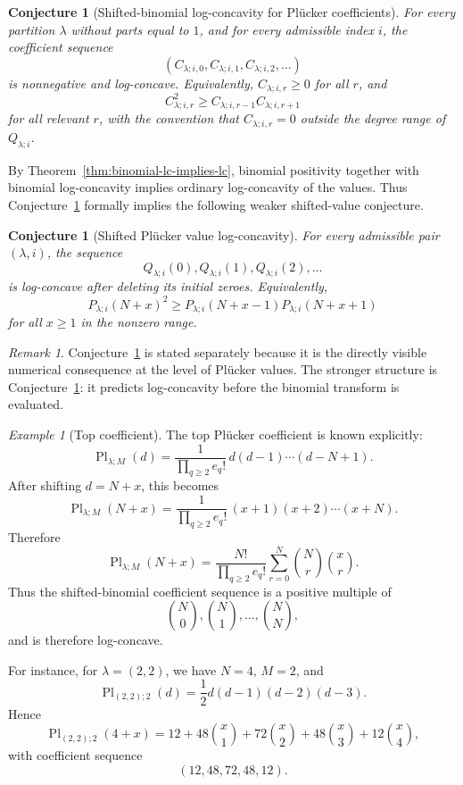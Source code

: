 \documentclass[11pt]{amsart}
\numberwithin{equation}{section}
\newtheorem{conjecture}[theorem]{Conjecture}
\theoremstyle{remark}
\newtheorem{remark}[theorem]{Remark}
\newtheorem{example}[theorem]{Example}
\begin{document}
\begin{conjecture}[Shifted-binomial log-concavity for Pl\"ucker coefficients]
\label{conj:shifted-plucker-binomial-lc}
For every partition $\lambda$ without parts equal to $1$, and for every
admissible index $i$, the coefficient sequence
\[
  (C_{\lambda;i,0},C_{\lambda;i,1},C_{\lambda;i,2},\ldots)
\]
is nonnegative and log-concave.  Equivalently, $C_{\lambda;i,r}\ge 0$ for all $r$, and
\[
  C_{\lambda;i,r}^2
  \ge
  C_{\lambda;i,r-1}C_{\lambda;i,r+1}
\]
for all relevant $r$, with the convention that $C_{\lambda;i,r}=0$
outside the degree range of $Q_{\lambda;i}$.
\end{conjecture}

By Theorem~\ref{thm:binomial-lc-implies-lc}, binomial positivity together
with binomial log-concavity implies ordinary log-concavity of the values.
Thus Conjecture~\ref{conj:shifted-plucker-binomial-lc} formally implies
the following weaker shifted-value conjecture.

\begin{conjecture}[Shifted Pl\"ucker value log-concavity]
\label{conj:shifted-plucker-value-lc}
For every admissible pair $(\lambda,i)$, the sequence
\[
  Q_{\lambda;i}(0),Q_{\lambda;i}(1),Q_{\lambda;i}(2),\ldots
\]
is log-concave after deleting its initial zeroes.  Equivalently,
\[
  P_{\lambda;i}(N+x)^2
  \ge
  P_{\lambda;i}(N+x-1)P_{\lambda;i}(N+x+1)
\]
for all $x\ge1$ in the nonzero range.
\end{conjecture}

\begin{remark}
 Conjecture~\ref{conj:shifted-plucker-value-lc} is stated separately
because it is the directly visible numerical consequence at the level of
Pl\"ucker values.  The stronger structure is
Conjecture~\ref{conj:shifted-plucker-binomial-lc}: it predicts
log-concavity before the binomial transform is evaluated.
\end{remark}

\begin{example}[Top coefficient]
\label{ex:plucker-top-shifted-binomial}
The top Pl\"ucker coefficient is known explicitly:
\[
  \operatorname{Pl}_{\lambda;M}(d)
  =
  \frac{1}{\prod_{q\ge2} e_q!}\,
  d(d-1)\cdots(d-N+1).
\]
After shifting $d=N+x$, this becomes
\[
  \operatorname{Pl}_{\lambda;M}(N+x)
  =
  \frac{1}{\prod_{q\ge2} e_q!}\,
  (x+1)(x+2)\cdots(x+N).
\]
Therefore
\[
  \operatorname{Pl}_{\lambda;M}(N+x)
  =
  \frac{N!}{\prod_{q\ge2} e_q!}
  \sum_{r=0}^{N}\binom Nr\binom xr.
\]
Thus the shifted-binomial coefficient sequence is a positive multiple of
\[
  \binom N0,\binom N1,\ldots,\binom NN,
\]
and is therefore log-concave.

For instance, for $\lambda=(2,2)$, we have $N=4$, $M=2$, and
\[
  \operatorname{Pl}_{(2,2);2}(d)
  =
  \frac12 d(d-1)(d-2)(d-3).
\]
Hence
\[
  \operatorname{Pl}_{(2,2);2}(4+x)
  =
  12
  +48\binom x1
  +72\binom x2
  +48\binom x3
  +12\binom x4,
\]
with coefficient sequence
\[
  (12,48,72,48,12).
\]
\end{example}
\end{document}
